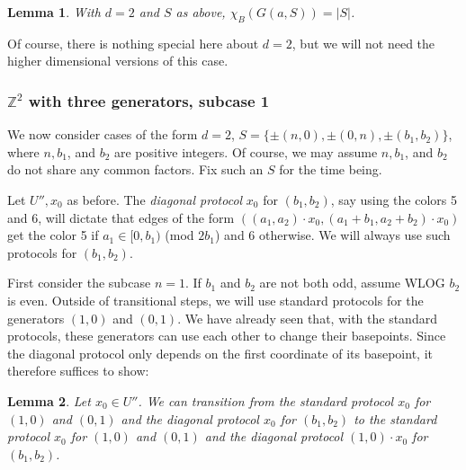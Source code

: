 \documentclass[10pt,a4paper]{article}
\newcommand{\0}{\varnothing}
\newcommand{\Z}{\mathbb{Z}}
\newtheorem{lemma}{Lemma}
\begin{document}
\begin{lemma}\label{lem:mult}
With $d=2$ and $S$ as above, $\chi_B(G(a,S)) = |S|$.
\end{lemma}

Of course, there is nothing special here about $d=2$, but we will not need the higher dimensional versions of this case.

\subsubsection{$\Z^2$ with three generators, subcase 1}\label{subsubsec:3gen1}

We now consider cases of the form $d = 2$, $S = \{\pm(n,0),\pm(0,n),\pm(b_1,b_2)\}$, where $n,b_1$, and $b_2$ are positive integers. Of course, we may assume $n,b_1$, and $b_2$ do not share any common factors. Fix such an $S$ for the time being.

Let $U'', x_0$ as before. The \textit{diagonal protocol} $x_0$ for $(b_1,b_2)$, say using the colors 5 and 6, will dictate that edges of the form $((a_1,a_2) \cdot x_0 , (a_1+b_1,a_2+b_2) \cdot x_0)$ get the color 5 if $a_1 \in [0,b_1)$ (mod $2b_1$) and 6 otherwise. We will always use such protocols for $(b_1,b_2)$.

First consider the subcase $n = 1$. If $b_1$ and $b_2$ are not both odd, assume WLOG $b_2$ is even. Outside of transitional steps, we will use standard protocols for the generators $(1,0)$ and $(0,1)$. We have already seen that, with the standard protocols, these generators can use each other to change their basepoints. Since the diagonal protocol only depends on the first coordinate of its basepoint, it therefore suffices to show:

\begin{lemma}\label{lem:3gentrans1}
Let $x_0 \in U''$. We can transition from the standard protocol $x_0$ for $(1,0)$ and $(0,1)$ and the diagonal protocol $x_0$ for $(b_1,b_2)$ to the standard protocol $x_0$ for $(1,0)$ and $(0,1)$ and the diagonal protocol $(1,0) \cdot x_0$ for $(b_1,b_2)$.
\end{lemma}
\end{document}
